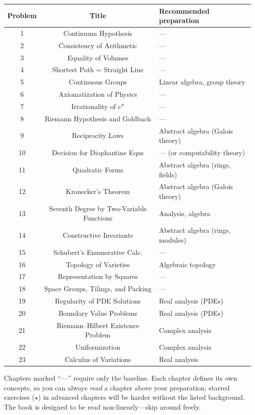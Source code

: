 \begin{center}
\small
\renewcommand{\arraystretch}{1.2}
\begin{tabular}{ccl}
\toprule
\textbf{Problem} & \textbf{Title} & \textbf{Recommended preparation} \\
\midrule
1 & Continuum Hypothesis & --- \\
2 & Consistency of Arithmetic & --- \\
3 & Equality of Volumes & --- \\
4 & Shortest Path = Straight Line & --- \\
5 & Continuous Groups & Linear algebra, group theory \\
6 & Axiomatization of Physics & --- \\
7 & Irrationality of $e^\pi$ & --- \\
8 & Riemann Hypothesis and Goldbach & --- \\
9 & Reciprocity Laws & Abstract algebra (Galois theory) \\
10 & Decision for Diophantine Eqns & --- (or computability theory) \\
11 & Quadratic Forms & Abstract algebra (rings, fields) \\
12 & Kronecker's Theorem & Abstract algebra (Galois theory) \\
13 & Seventh Degree by Two-Variable Functions & Analysis, algebra \\
14 & Constructive Invariants & Abstract algebra (rings, modules) \\
15 & Schubert's Enumerative Calc. & --- \\
16 & Topology of Varieties & Algebraic topology \\
17 & Representation by Squares & --- \\
18 & Space Groups, Tilings, and Packing & --- \\
19 & Regularity of PDE Solutions & Real analysis (PDEs) \\
20 & Boundary Value Problems & Real analysis (PDEs) \\
21 & Riemann--Hilbert Existence Problem & Complex analysis \\
22 & Uniformization & Complex analysis \\
23 & Calculus of Variations & Real analysis \\
\bottomrule
\end{tabular}
\end{center}

Chapters marked ``---'' require only the baseline. Each chapter defines its own concepts, so you can always \emph{read} a chapter above your preparation; starred exercises ($\star$) in advanced chapters will be harder without the listed background. The book is designed to be read non-linearly---skip around freely.

